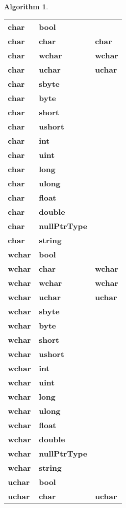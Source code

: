 \documentclass[a4paper,oneside,11pt]{book}
\theoremstyle{definition}
\newtheorem{algo}{Algorithm}[section]
\begin{document}
\begin{algo}
\begin{flushleft}
\begin{supertabular}{lll}
\hline
\textbf{char}& \textbf{bool}& \\
\textbf{char}& \textbf{char}& \textbf{char}\\
\textbf{char}& \textbf{wchar}& \textbf{wchar}\\
\textbf{char}& \textbf{uchar}& \textbf{uchar}\\
\textbf{char}& \textbf{sbyte}& \\
\textbf{char}& \textbf{byte}& \\
\textbf{char}& \textbf{short}& \\
\textbf{char}& \textbf{ushort}& \\
\textbf{char}& \textbf{int}& \\
\textbf{char}& \textbf{uint}& \\
\textbf{char}& \textbf{long}& \\
\textbf{char}& \textbf{ulong}& \\
\textbf{char}& \textbf{float}& \\
\textbf{char}& \textbf{double}& \\
\textbf{char}& \textbf{nullPtrType}& \\
\textbf{char}& \textbf{string}& \\
\hline
\textbf{wchar}& \textbf{bool}& \\
\textbf{wchar}& \textbf{char}& \textbf{wchar}\\
\textbf{wchar}& \textbf{wchar}& \textbf{wchar}\\
\textbf{wchar}& \textbf{uchar}& \textbf{uchar}\\
\textbf{wchar}& \textbf{sbyte}& \\
\textbf{wchar}& \textbf{byte}& \\
\textbf{wchar}& \textbf{short}& \\
\textbf{wchar}& \textbf{ushort}& \\
\textbf{wchar}& \textbf{int}& \\
\textbf{wchar}& \textbf{uint}& \\
\textbf{wchar}& \textbf{long}& \\
\textbf{wchar}& \textbf{ulong}& \\
\textbf{wchar}& \textbf{float}& \\
\textbf{wchar}& \textbf{double}& \\
\textbf{wchar}& \textbf{nullPtrType}& \\
\textbf{wchar}& \textbf{string}& \\
\hline
\textbf{uchar}& \textbf{bool}&\\
\textbf{uchar}& \textbf{char}& \textbf{uchar}\\

\end{supertabular}
\end{flushleft}
\end{algo}
\end{document}
